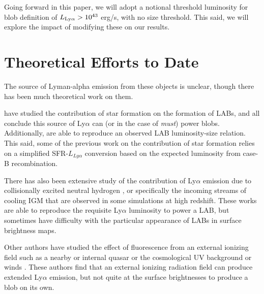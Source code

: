 Going forward in this paper, we will adopt a notional threshold luminosity for blob definition of $L_{\rm Ly\alpha} > 10^{43}$ erg/s, with no size threshold.
This said, we will explore the impact of modifying these on our results.

\section{Theoretical Efforts to Date}

The source of Lyman-alpha emission from these objects is unclear, though there has been much theoretical work on them.

\citet{Furlanetto2005, Laursen2007, Cen2013, Geach2016, Gronke2017} have studied the contribution of star formation on the formation of LABs, and all conclude this source of Ly$\alpha$ can (or in the case of \citet{Cen2013} \emph{must}) power blobs.
Additionally, \citet{Cen2013} are able to reproduce an observed LAB luminosity-size relation.
This said, some of the previous work on the contribution of star formation relies on a simplified SFR-$L_{Ly\alpha}$ conversion based on the expected luminosity from case-B recombination.

There has also been extensive study of the contribution of Ly$\alpha$ emission due to collisionally excited neutral hydrogen \citep{Rosdahl2012, Fardal2001, Goerdt2010, Haiman2000, Faucher-Giguere2010}, or specifically the incoming streams of cooling IGM that are observed in some simulations at high redshift.
These works are able to reproduce the requisite Ly$\alpha$ luminosity to power a LAB, but sometimes have difficulty with the particular appearance of LABs in surface brightness maps.

Other authors have studied the effect of fluorescence from an external ionizing field such as a nearby or internal quasar \citep{Haiman2001} or the cosmological UV background or winds \citep{Furlanetto2005, Mas-Ribas2016}.
These authors find that an external ionizing radiation field can produce extended Ly$\alpha$ emission, but not quite at the surface brightnesses to produce a blob on its own.

